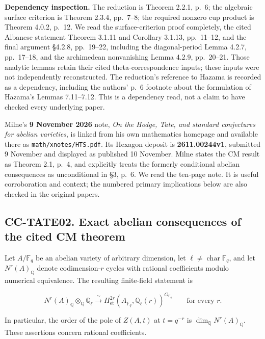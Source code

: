 \documentclass[11pt,a4paper]{article}
\theoremstyle{definition}\newtheorem{definition}[theorem]{Definition}
\theoremstyle{remark}\newtheorem{remark}[theorem]{Remark}
\begin{document}
\textbf{Dependency inspection.} The reduction is Theorem 2.2.1, p.~6;
the algebraic surface criterion is Theorem 2.3.4, pp.~7--8; the required
nonzero cup product is Theorem 4.0.2, p.~12. We read the
surface-criterion proof completely, the cited Albanese statement Theorem
3.1.11 and Corollary 3.1.13, pp.~11--12, and the final argument §4.2.8,
pp.~19--22, including the diagonal-period Lemma 4.2.7, pp.~17--18, and
the archimedean nonvanishing Lemma 4.2.9, pp.~20--21. Those analytic
lemmas retain their cited theta-correspondence inputs; these inputs were
not independently reconstructed. The reduction's reference to Hazama is
recorded as a dependency, including the authors' p.~6 footnote about the
formulation of Hazama's Lemmas 7.11--7.12. This is a dependency read,
not a claim to have checked every underlying paper.

Milne's \textbf{9 November 2026} note, \emph{On the Hodge, Tate, and
standard conjectures for abelian varieties}, is linked from his own
mathematics homepage and available there as
\texttt{math/xnotes/HTS.pdf}. Its Hexagon deposit is
\textbf{2611.00244v1}, submitted 9 November and displayed as published
10 November. Milne states the CM result as Theorem 2.1, p.~4, and
explicitly treats the formerly conditional abelian consequences as
unconditional in §3, p.~6. We read the ten-page note. It is useful
corroboration and context; the numbered primary implications below are
also checked in the original papers.

\subsection{CC-TATE02. Exact abelian consequences of the cited CM
theorem}\label{cc-tate02.-exact-abelian-consequences-of-the-cited-cm-theorem}

Let \(A/\mathbb F_q\) be an abelian variety of arbitrary dimension, let
\(\ell\ne\operatorname{char}\mathbb F_q\), and let
\(N^r(A)_{\mathbb Q}\) denote codimension-\(r\) cycles with rational
coefficients modulo numerical equivalence. The resulting finite-field
statement is

\[
N^r(A)_{\mathbb Q}\otimes_{\mathbb Q}\mathbb Q_\ell
\xrightarrow{\ \sim\ }
H^{2r}_{\mathrm{et}}(A_{\overline{\mathbb F}_q},\mathbb Q_\ell(r))^{G_{\mathbb F_q}}
\qquad\text{for every }r.
\]

In particular, the order of the pole of \(Z(A,t)\) at \(t=q^{-r}\) is
\(\dim_{\mathbb Q}N^r(A)_{\mathbb Q}\). These assertions concern
rational coefficients.
\end{document}
